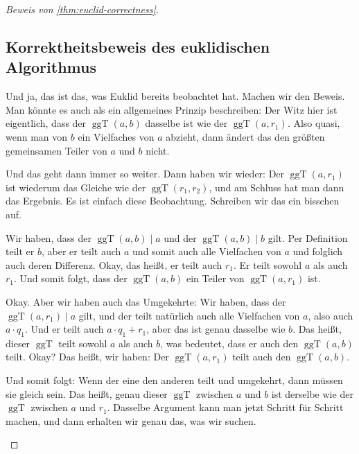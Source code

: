 \begin{proof}[Beweis von \cref{thm:euclid-correctness}]

\subsection{Korrektheitsbeweis des euklidischen Algorithmus}

\begin{spoken-clean}[00:34:13 - 00:37:41]
Und ja, das ist das, was Euklid bereits beobachtet hat. Machen wir den Beweis. Man könnte es auch als ein allgemeines Prinzip beschreiben: Der Witz hier ist eigentlich, dass der $\operatorname{ggT}(a, b)$ dasselbe ist wie der $\operatorname{ggT}(a, r_1)$. Also quasi, wenn man von $b$ ein Vielfaches von $a$ abzieht, dann ändert das den größten gemeinsamen Teiler von $a$ und $b$ nicht.

Und das geht dann immer so weiter. Dann haben wir wieder: Der $\operatorname{ggT}(a, r_1)$ ist wiederum das Gleiche wie der $\operatorname{ggT}(r_1, r_2)$, und am Schluss hat man dann das Ergebnis. Es ist einfach diese Beobachtung. Schreiben wir das ein bisschen auf.

Wir haben, dass der $\operatorname{ggT}(a, b) \mid a$ und der $\operatorname{ggT}(a, b) \mid b$ gilt. Per Definition teilt er $b$, aber er teilt auch $a$ und somit auch alle Vielfachen von $a$ und folglich auch deren Differenz. Okay, das heißt, er teilt auch $r_1$. Er teilt sowohl $a$ als auch $r_1$. Und somit folgt, dass der $\operatorname{ggT}(a, b)$ ein Teiler von $\operatorname{ggT}(a, r_1)$ ist.

Okay. Aber wir haben auch das Umgekehrte: Wir haben, dass der $\operatorname{ggT}(a, r_1) \mid a$ gilt, und der teilt natürlich auch alle Vielfachen von $a$, also auch $a \cdot q_1$. Und er teilt auch $a \cdot q_1 + r_1$, aber das ist genau dasselbe wie $b$. Das heißt, dieser $\operatorname{ggT}$ teilt sowohl $a$ als auch $b$, was bedeutet, dass er auch den $\operatorname{ggT}(a, b)$ teilt. Okay? Das heißt, wir haben: Der $\operatorname{ggT}(a, r_1)$ teilt auch den $\operatorname{ggT}(a, b)$.

Und somit folgt: Wenn der eine den anderen teilt und umgekehrt, dann müssen sie gleich sein. Das heißt, genau dieser $\operatorname{ggT}$ zwischen $a$ und $b$ ist derselbe wie der $\operatorname{ggT}$ zwischen $a$ und $r_1$. Dasselbe Argument kann man jetzt Schritt für Schritt machen, und dann erhalten wir genau das, was wir suchen.
\end{spoken-clean}


\end{proof}
